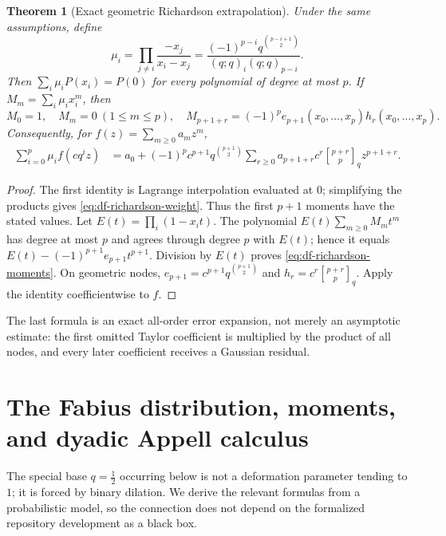 \documentclass[11pt,oneside,openany]{book}
\newtheorem{theorem}{Theorem}[chapter]
\theoremstyle{definition}
\theoremstyle{remark}
\newcommand{\Qbinom}[3]{\genfrac{[}{]}{0pt}{}{#1}{#2}_{#3}}
\begin{document}
\begin{theorem}[Exact geometric Richardson extrapolation]
\label{thm:df-geometric-richardson}
Under the same assumptions, define
\begin{equation}
 \mu_i=\prod_{j\ne i}\frac{-x_j}{x_i-x_j}
 =\frac{(-1)^{p-i}q^{\binom{p-i+1}{2}}}
 {(q;q)_i(q;q)_{p-i}}.
 \label{eq:df-richardson-weight}
\end{equation}
Then $\sum_i\mu_iP(x_i)=P(0)$ for every polynomial of degree at most $p$.
If $M_m=\sum_i\mu_ix_i^m$, then
\begin{equation}
 M_0=1,
 \quad M_m=0\ (1\le m\le p),
 \quad
 M_{p+1+r}=(-1)^p e_{p+1}(x_0,\ldots,x_p)
 h_r(x_0,\ldots,x_p).
 \label{eq:df-richardson-moments}
\end{equation}
Consequently, for $f(z)=\sum_{m\ge0}a_mz^m$,
\begin{align}
 \sum_{i=0}^{p}\mu_i f(cq^i z)
 &=a_0+(-1)^pc^{p+1}q^{\binom{p+1}{2}}
 \sum_{r\ge0}a_{p+1+r}c^r\Qbinom{p+r}{p}qz^{p+1+r}.
 \label{eq:df-richardson-series}
\end{align}
\end{theorem}

\begin{proof}
The first identity is Lagrange interpolation evaluated at $0$; simplifying the
products gives \eqref{eq:df-richardson-weight}.  Thus the first $p+1$ moments
have the stated values.  Let $E(t)=\prod_i(1-x_it)$.  The polynomial
$E(t)\sum_{m\ge0}M_mt^m$ has degree at most $p$ and agrees through degree $p$
with $E(t)$; hence it equals $E(t)-(-1)^{p+1}e_{p+1}t^{p+1}$.  Division by
$E(t)$ proves \eqref{eq:df-richardson-moments}.  On geometric nodes,
$e_{p+1}=c^{p+1}q^{\binom{p+1}{2}}$ and
$h_r=c^r\Qbinom{p+r}{p}q$.  Apply the identity coefficientwise to $f$.
\end{proof}

The last formula is an exact all-order error expansion, not merely an
asymptotic estimate: the first omitted Taylor coefficient is multiplied by
the product of all nodes, and every later coefficient receives a Gaussian
residual.

\chapter{The Fabius distribution, moments, and dyadic Appell calculus}
\label{chap:fabius-appell}

The special base $q=\tfrac12$ occurring below is not a deformation parameter
tending to $1$; it is forced by binary dilation.  We derive the relevant
formulas from a probabilistic model, so the connection does not depend on the
formalized repository development as a black box.
\end{document}
